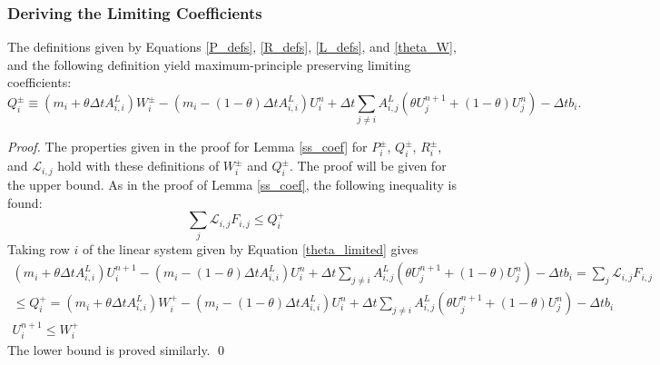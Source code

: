 \subsubsection{Deriving the Limiting Coefficients}
\begin{lemma}
   The definitions given by Equations \ref{P_defs}, \ref{R_defs}, \ref{L_defs},
   and \ref{theta_W},
   and the following definition yield maximum-principle preserving limiting coefficients:
   \begin{equation}
      Q_i^\pm \equiv (m_i+\theta\Delta t A_{i,i}^L)W_i^\pm
       - (m_i-(1-\theta)\Delta t A_{i,i}^L)U_i^n
       + \Delta t\sum\limits_{j\ne i} A_{i,j}^L (\theta U_j^{n+1}+(1-\theta)U_j^n)
       - \Delta t b_i.
   \end{equation}
\end{lemma}

\begin{proof}
   The properties given in the proof for Lemma \ref{ss_coef} for $P_i^\pm$,
   $Q_i^\pm$, $R_i^\pm$, and $\mathcal{L}_{i,j}$ hold with these definitions
   of $W_i^\pm$ and $Q_i^\pm$.
   The proof will be given for the upper bound. 
   As in the proof of Lemma \ref{ss_coef}, the following inequality is found:
   \[
      \sum\limits_j \mathcal{L}_{i,j}F_{i,j} \leq Q_i^+
   \]
   Taking row $i$ of the linear system given by Equation \ref{theta_limited} gives
   \begin{multline*}
     (m_i+\theta\Delta t A_{i,i}^L)U_i^{n+1}
       - (m_i-(1-\theta)\Delta t A_{i,i}^L)U_i^n
       + \Delta t\sum\limits_{j\ne i} A_{i,j}^L (\theta U_j^{n+1}+(1-\theta)U_j^n)
       - \Delta t b_i = \sum\limits_j \mathcal{L}_{i,j}F_{i,j}\\
     \leq Q_i^+ = (m_i+\theta\Delta t A_{i,i}^L)W_i^+
       - (m_i-(1-\theta)\Delta t A_{i,i}^L)U_i^n
       + \Delta t\sum\limits_{j\ne i} A_{i,j}^L (\theta U_j^{n+1}+(1-\theta)U_j^n)
       - \Delta t b_i\\
      U_i^{n+1} \leq W_i^+ 
   \end{multline*}
   The lower bound is proved similarly.
   \qed
\end{proof}